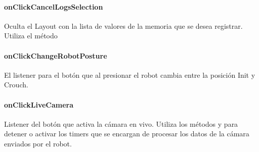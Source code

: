 \paragraph{onClickCancelLogsSelection}
\label{\detokenize{dev_docs:onclickcancellogsselection}}

\begin{fulllineitems}
\label{\detokenize{dev_docs:com.lar.cloudnao.RemoteControllerActivity.onClickCancelLogsSelection()}}
Oculta el Layout con la lista de valores de la memoria que se desea registrar. Utiliza el método {\hyperref[\detokenize{dev_docs:com.lar.cloudnao.RemoteControllerActivity.hideProxiesListView()}]{}}

\end{fulllineitems}



\paragraph{onClickChangeRobotPosture}
\label{\detokenize{dev_docs:onclickchangerobotposture}}

\begin{fulllineitems}
\label{\detokenize{dev_docs:com.lar.cloudnao.RemoteControllerActivity.onClickChangeRobotPosture()}}
El listener para el botón que al presionar el robot cambia entre la posición Init y Crouch.

\end{fulllineitems}



\paragraph{onClickLiveCamera}
\label{\detokenize{dev_docs:onclicklivecamera}}

\begin{fulllineitems}
\label{\detokenize{dev_docs:com.lar.cloudnao.RemoteControllerActivity.onClickLiveCamera()}}
Listener del botón que activa la cámara en vivo. Utiliza los métodos  y  para detener o activar los timers que se encargan de procesar los datos de la cámara enviados por el robot.

\end{fulllineitems}



